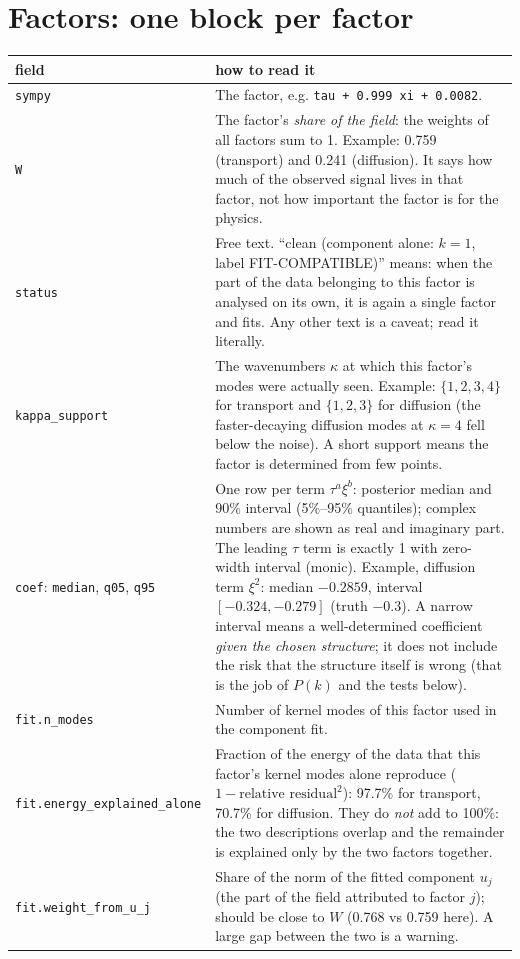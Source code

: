 \documentclass[11pt,a4paper]{article}
\newcommand{\code}[1]{\texttt{#1}}
\begin{document}
\section{Factors: one block per factor}
\begin{center}\small
\begin{tabular}{L{4.0cm}L{10.0cm}}\toprule
\textbf{field} & \textbf{how to read it}\\\midrule
\code{sympy} & The factor, e.g. \code{tau + 0.999 xi + 0.0082}.\\
\code{W} & The factor's \emph{share of the field}: the weights of all factors sum to 1. Example: 0.759 (transport) and 0.241 (diffusion). It says how much of the observed signal lives in that factor, not how important the factor is for the physics.\\
\code{status} & Free text. ``clean (component alone: $k=1$, label FIT-COMPATIBLE)'' means: when the part of the data belonging to this factor is analysed on its own, it is again a single factor and fits. Any other text is a caveat; read it literally.\\
\code{kappa\_support} & The wavenumbers $\kappa$ at which this factor's modes were actually seen. Example: $\{1,2,3,4\}$ for transport and $\{1,2,3\}$ for diffusion (the faster-decaying diffusion modes at $\kappa=4$ fell below the noise). A short support means the factor is determined from few points.\\
\code{coef}: \code{median}, \code{q05}, \code{q95} & One row per term $\tau^a\xi^b$: posterior median and 90\% interval (5\%--95\% quantiles); complex numbers are shown as real and imaginary part. The leading $\tau$ term is exactly 1 with zero-width interval (monic). Example, diffusion term $\xi^2$: median $-0.2859$, interval $[-0.324,-0.279]$ (truth $-0.3$). A narrow interval means a well-determined coefficient \emph{given the chosen structure}; it does not include the risk that the structure itself is wrong (that is the job of $P(k)$ and the tests below).\\
\code{fit.n\_modes} & Number of kernel modes of this factor used in the component fit.\\
\code{fit.energy\_}\code{explained\_alone} & Fraction of the energy of the data that this factor's kernel modes alone reproduce ($1-\text{relative residual}^2$): 97.7\% for transport, 70.7\% for diffusion. They do \emph{not} add to 100\%: the two descriptions overlap and the remainder is explained only by the two factors together.\\
\code{fit.weight\_}\code{from\_u\_j} & Share of the norm of the fitted component $u_j$ (the part of the field attributed to factor $j$); should be close to $W$ (0.768 vs 0.759 here). A large gap between the two is a warning.\\\bottomrule
\end{tabular}
\end{center}
\end{document}

